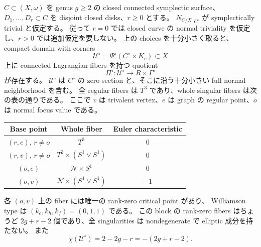 \begin{theorem}
\label{fhr:actual-block}
$C\subset(X,\omega)$ を genus $g\ge2$ の closed connected symplectic surface、
$D_1,\ldots,D_r\subset C$ を disjoint closed disks、$r\ge0$ とする。
$N_{C/X}|_{C^\circ}$ が symplectically trivial と仮定する。
従って $r=0$ では closed curve の normal triviality を仮定し、$r>0$ では追加仮定を要しない。
上の choices を十分小さく取ると、compact domain with corners
\[
 \mathcal U^\circ=\Psi^\circ(C^\circ\times K_c)\subset X
\]
上に connected Lagrangian fibers を持つ quotient
\begin{equation}\label{fhr:quotient}
 \Pi^\circ:\mathcal U^\circ\longrightarrow R\times\Gamma^\circ
\end{equation}
が存在する。
$\mathcal U^\circ$ は $C^\circ$ の zero section と、そこに沿う十分小さい full normal neighborhood を含む。
全 regular fibers は $T^3$ であり、whole singular fibers は次の表の通りである。
ここで $v$ は trivalent vertex、$e$ は graph の regular point、$o$ は normal focus value である。
\begin{center}
\begin{tabular}{c|c|c}
Base point & Whole fiber & Euler characteristic \\
\hline
$(r,e)$, $r\ne o$ & $T^3$ & $0$ \\
$(r,v)$, $r\ne o$ & $T^2\times(S^1\vee S^1)$ & $0$ \\
$(o,e)$ & $\mathcal N\times S^1$ & $0$ \\
$(o,v)$ & $\mathcal N\times(S^1\vee S^1)$ & $-1$
\end{tabular}
\end{center}
各 $(o,v)$ 上の fiber には唯一の rank-zero critical point があり、
Williamson type は $(k_e,k_h,k_f)=(0,1,1)$ である。
この block の rank-zero fibers はちょうど $2g+r-2$ 個であり、全 singularities は nondegenerate で elliptic 成分を持たない。
また
\begin{equation}\label{fhr:block-euler}
 \boxed{\quad\chi(\mathcal U^\circ)=2-2g-r=-(2g+r-2).\quad}
\end{equation}
\end{theorem}


